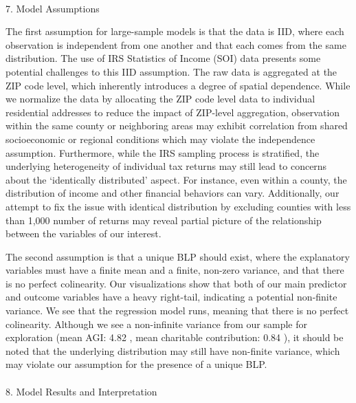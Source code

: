 \documentclass[
  letterpaper,
  DIV=11,
  numbers=noendperiod]{scrartcl}
\makeatletter
\let\oldparagraph\paragraph
\renewcommand{\paragraph}{
    \@ifstar
      \xxxParagraphStar
      \xxxParagraphNoStar
  }
\newcommand{\xxxParagraphStar}[1]{\oldparagraph*{#1}\mbox{}}
\newcommand{\xxxParagraphNoStar}[1]{\oldparagraph{#1}\mbox{}}
\makeatother
\begin{document}
\paragraph{7. Model Assumptions}\label{model-assumptions}

The first assumption for large-sample models is that the data is IID,
where each observation is independent from one another and that each
comes from the same distribution. The use of IRS Statistics of Income
(SOI) data presents some potential challenges to this IID assumption.
The raw data is aggregated at the ZIP code level, which inherently
introduces a degree of spatial dependence. While we normalize the data
by allocating the ZIP code level data to individual residential
addresses to reduce the impact of ZIP-level aggregation, observation
within the same county or neighboring areas may exhibit correlation from
shared socioeconomic or regional conditions which may violate the
independence assumption. Furthermore, while the IRS sampling process is
stratified, the underlying heterogeneity of individual tax returns may
still lead to concerns about the `identically distributed' aspect. For
instance, even within a county, the distribution of income and other
financial behaviors can vary. Additionally, our attempt to fix the issue
with identical distribution by excluding counties with less than 1,000
number of returns may reveal partial picture of the relationship between
the variables of our interest.

The second assumption is that a unique BLP should exist, where the
explanatory variables must have a finite mean and a finite, non-zero
variance, and that there is no perfect colinearity. Our visualizations
show that both of our main predictor and outcome variables have a heavy
right-tail, indicating a potential non-finite variance. We see that the
regression model runs, meaning that there is no perfect colinearity.
Although we see a non-infinite variance from our sample for exploration
(mean AGI: 4.82 , mean charitable contribution: 0.84 ), it should be
noted that the underlying distribution may still have non-finite
variance, which may violate our assumption for the presence of a unique
BLP.

\paragraph{8. Model Results and
Interpretation}\label{model-results-and-interpretation}
\end{document}
